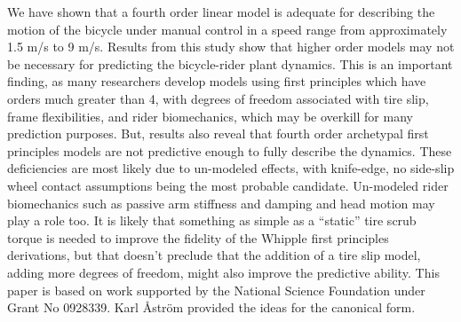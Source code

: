 \documentclass[a4paper]{article}
\begin{document}
We have shown that a fourth order linear model is adequate for describing the
motion of the bicycle under manual control in a speed range from approximately
1.5 m/s to 9 m/s. Results from this study show that higher order models may
not be necessary for predicting the bicycle-rider plant dynamics. This is an
important finding, as many researchers develop models using first principles
which have orders much greater than 4, with degrees of freedom associated with
tire slip, frame flexibilities, and rider biomechanics, which may be overkill
for many prediction purposes. But, results also reveal that fourth order
archetypal first principles models are not predictive enough to fully describe
the dynamics. These deficiencies are most likely due to un-modeled effects,
with knife-edge, no side-slip wheel contact assumptions being the most probable
candidate. Un-modeled rider biomechanics such as passive arm stiffness and
damping and head motion may play a role too. It is likely that something as
simple as a ``static'' tire scrub torque is needed to improve the fidelity of
the Whipple first principles derivations, but that doesn't preclude that the
addition of a tire slip model, adding more degrees of freedom, might also
improve the predictive ability.
This paper is based on work supported by the National Science Foundation under
Grant No 0928339. Karl {\AA}str{\"o}m provided the ideas for the canonical form.



\end{document}
